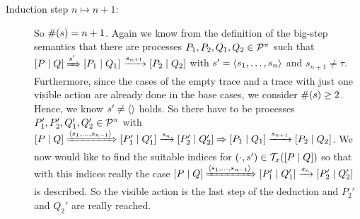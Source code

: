 \begin{prf}
\begin{description}
\item[Induction step $n\mapsto n+1$:] So $\#(s)=n+1$. Again we know from the definition of the big-step semantics that there are processes $P_1,P_2,Q_1,Q_2\in\mathcal P^{\pi}$ such that $\left[P \mid Q\right]\xRightarrow{s'}\left[P_1 \mid Q_1\right]\xrightarrow{s_{n+1}}\left[P_2 \mid Q_2\right]$ with $s'=\langle s_1,\ldots,s_n\rangle$ and $s_{n+1}\neq\tau$. Furthermore, since the cases of the empty trace and a trace with just one visible action are already done in the base cases, we consider $\#(s)\geq2$. Hence, we know $s'\neq\langle\rangle$ holds. So there have to be processes $P_1',P_2',Q_1',Q_2'\in\mathcal P^{\pi}$ with $\left[P \mid Q\right]\xRightarrow{\langle s_1,\ldots,s_{n-1}\rangle}\left[P_1' \mid Q_1'\right]\xrightarrow{s_n}\left[P_2' \mid Q_2'\right]\xRightarrow{}\left[P_1 \mid Q_1\right]\xrightarrow{s_{n+1}}\left[P_2 \mid Q_2\right]$. We now would like to find the suitable indices for $\left(\cdot,s'\right)\in\mathcal T_{x}(\left[P \mid Q\right])$ so that with this indices really the case $\left[P \mid Q\right]\xRightarrow{\langle s_1,\ldots,s_{n-1}\rangle}\left[P_1' \mid Q_1'\right]\xrightarrow{s_n}\left[P_2' \mid Q_2'\right]$ is described. So the visible action is the last step of the deduction and $P_2'$ and $Q_2'$ are really reached.


\end{description}
\end{prf}
